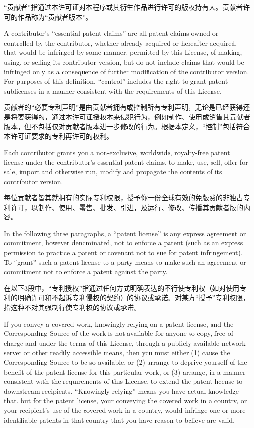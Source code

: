 \documentclass[11pt]{article}
\begin{document}
\begin{enumerate}
“贡献者”指通过本许可证对本程序或其衍生作品进行许可的版权持有人。贡献者许可的作品称为“贡献者版本”。

A contributor's ``essential patent claims'' are all patent claims
owned or controlled by the contributor, whether already acquired or
hereafter acquired, that would be infringed by some manner, permitted
by this License, of making, using, or selling its contributor version,
but do not include claims that would be infringed only as a
consequence of further modification of the contributor version.  For
purposes of this definition, ``control'' includes the right to grant
patent sublicenses in a manner consistent with the requirements of
this License.

贡献者的“必要专利声明”是由贡献者拥有或控制所有专利声明，无论是已经获得还是将要获得的，通过本许可证授权本来侵犯行为，例如制作、使用或销售其贡献者版本，但不包括仅对贡献者版本进一步修改的行为。根据本定义，“控制”包括符合本许可证要求的专利再许可的权利。

Each contributor grants you a non-exclusive, worldwide, royalty-free
patent license under the contributor's essential patent claims, to
make, use, sell, offer for sale, import and otherwise run, modify and
propagate the contents of its contributor version.

每位贡献者皆其就拥有的实际专利权限，授予你一份全球有效的免版费的非独占专利许可，以制作、使用、零售、批发、引进，及运行、修改、传播其贡献者版的内容。

In the following three paragraphs, a ``patent license'' is any express
agreement or commitment, however denominated, not to enforce a patent
(such as an express permission to practice a patent or covenant not to
sue for patent infringement).  To ``grant'' such a patent license to a
party means to make such an agreement or commitment not to enforce a
patent against the party.

在以下3段中，“专利授权”指通过任何方式明确表达的不行使专利权（如对使用专利的明确许可和不起诉专利侵权的契约）的协议或承诺。对某方“授予”专利权限，指这种不对其强制行使专利权的协议或承诺。

If you convey a covered work, knowingly relying on a patent license,
and the Corresponding Source of the work is not available for anyone
to copy, free of charge and under the terms of this License, through a
publicly available network server or other readily accessible means,
then you must either (1) cause the Corresponding Source to be so
available, or (2) arrange to deprive yourself of the benefit of the
patent license for this particular work, or (3) arrange, in a manner
consistent with the requirements of this License, to extend the patent
license to downstream recipients.  ``Knowingly relying'' means you have
actual knowledge that, but for the patent license, your conveying the
covered work in a country, or your recipient's use of the covered work
in a country, would infringe one or more identifiable patents in that
country that you have reason to believe are valid.


\end{enumerate}
\end{document}
